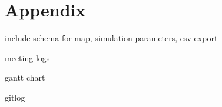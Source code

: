 \appendix

\section{Appendix}

include schema for map, simulation parameters, csv export

meeting logs

gantt chart

gitlog